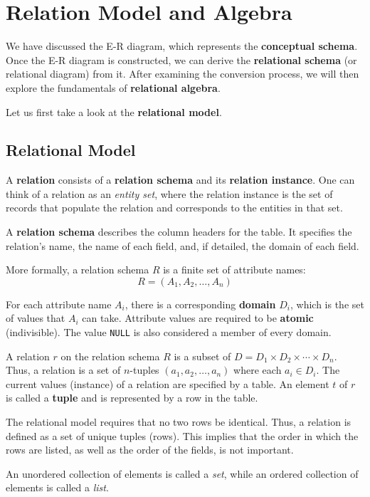 \chapter{Relation Model and Algebra}

We have discussed the E-R diagram, which represents the \textbf{conceptual schema}. Once the E-R diagram is constructed, we can derive the \textbf{relational schema} (or relational diagram) from it. After examining the conversion process, we will then explore the fundamentals of \textbf{relational algebra}.

Let us first take a look at the \textbf{relational model}. 

\section{Relational Model}
A \textbf{relation} consists of a \textbf{relation schema} and its \textbf{relation instance}. One can think of a relation as an \emph{entity set}, where the relation instance is the set of records that populate the relation and corresponds to the entities in that set.  

A \textbf{relation schema} describes the column headers for the table. It specifies the relation's name, the name of each field, and, if detailed, the domain of each field. 

More formally, a relation schema \(R\) is a finite set of attribute names:  
\[
R = (A_1, A_2, \dots, A_n)
\]  

For each attribute name \(A_i\), there is a corresponding \textbf{domain} \(D_i\), which is the set of values that \(A_i\) can take. Attribute values are required to be \textbf{atomic} (indivisible). The value \texttt{NULL} is also considered a member of every domain.

A relation \(r\) on the relation schema \(R\) is a subset of \(D = D_1 \times D_2 \times \cdots \times D_n\). Thus, a relation is a set of \(n\)-tuples \((a_1, a_2, \dots, a_n)\) where each \(a_i \in D_i\). The current values (instance) of a relation are specified by a table. An element \(t\) of \(r\) is called a \textbf{tuple} and is represented by a row in the table.

The relational model requires that no two rows be identical. Thus, a relation is defined as a set of unique tuples (rows). This implies that the order in which the rows are listed, as well as the order of the fields, is not important.

\begin{remark}
An unordered collection of elements is called a \emph{set}, while an ordered collection of elements is called a \emph{list}.
\end{remark}

